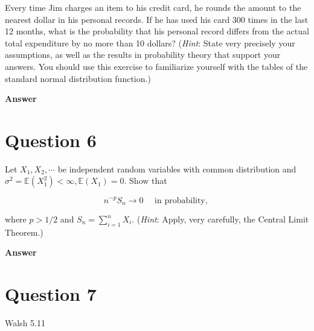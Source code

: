 \documentclass[letterpaper]{article}
\begin{document}
		Every time Jim charges an item to his credit card, he rounds the amount to the nearest dollar in his personal records. If he has used his card 300 times in the last 12 months, what is the probability that his personal record differs from the actual total expenditure by no more than 10 dollars? (\emph{Hint}: State very precisely your assumptions, as well as the results in probability theory that support your answers. You should use this exercise to familiarize yourself with the tables of the standard normal distribution function.)
		
		
		\textbf{Answer}
		
		\clearpage
		
		\section{Question 6}
		
		Let $X_{1}, X_{2}, \cdots$ be independent random variables with common distribution and $\sigma^{2}=\mathbb{E}\left(X_{1}^{2}\right)<\infty, \mathbb{E}\left(X_{1}\right)=0$. Show that
		
		$$
		n^{-p} S_{n} \longrightarrow 0 \quad \text { in probability, }
		$$
		
		where $p>1 / 2$ and $S_{n}=\sum_{i=1}^{n} X_{i}$. (\emph{Hint}: Apply, very carefully, the Central Limit Theorem.)
		
		\textbf{Answer}
		
		\clearpage
		
		\section{Question 7}
		
		{\color{deepred}  Walsh 5.11}
		
\end{document}

